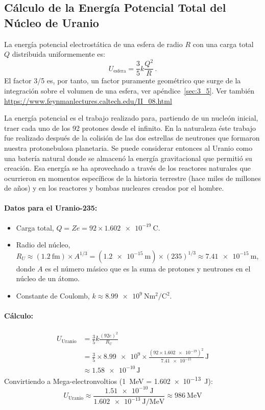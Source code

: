 \documentclass[11pt,a4paper]{book}
\begin{document}
\subsection*{Cálculo de la Energía Potencial Total del Núcleo de Uranio}
La energía potencial electrostática de una esfera de radio $R$ con una carga total $Q$ distribuida uniformemente es:
\begin{equation}
    U_{\text{esfera}} = \frac{3}{5} k \frac{Q^2}{R}\,.
\end{equation}
El factor 3/5 es, por tanto, un factor puramente geométrico que surge de la integración sobre el volumen de una esfera, ver apéndice~\ref{sec:3_5}. Ver también \url{https://www.feynmanlectures.caltech.edu/II_08.html}

La energía potencial es el trabajo realizado para, partiendo de un nucleón inicial, traer cada uno de los 92 protones desde el infinito. En la naturaleza éste trabajo fue realizado después de la colisión de las dos estrellas de neutrones que formaron nuestra protonebulosa planetaria. Se puede considerar entonces al Uranio como una batería natural donde se almacenó la energía gravitacional que permitió su creación. Esa energía se ha aprovechado a través de los reactores naturales que ocurrieron en momentos específicos de la historia terrestre (hace miles de millones de años) y en los reactores y bombas nucleares creados por el hombre.


\paragraph{Datos para el Uranio-235:}
\begin{itemize}
    \item Carga total, $Q = Z e = 92 \times \SI{1.602e-19}{\coulomb}$.
    \item Radio del núcleo, $R_U \approx (\SI{1.2}{\femto\meter}) \times A^{1/3} = (\SI{1.2e-15}{\meter}) \times (235)^{1/3} \approx \SI{7.41e-15}{\meter}$, donde $A$ es el número másico que es la suma de protones y neutrones en el núcleo de un átomo.
    \item Constante de Coulomb, $k \approx \SI{8.99e9}{\newton\meter\squared\per\coulomb\squared}$.
\end{itemize}

\paragraph{Cálculo:}
\begin{align*}
    U_{\text{Uranio}} &= \frac{3}{5} k \frac{(92e)^2}{R_U} \\
    &= \frac{3}{5} \times \num{8.99e9} \times \frac{(92 \times \num{1.602e-19})^2}{\num{7.41e-15}} \, \si{\joule} \\
    &\approx \num{1.58e-10} \, \si{\joule}
\end{align*}
Convirtiendo a Mega-electronvoltios (\SI{1}{\mega\electronvolt} = \SI{1.602e-13}{\joule}):
\[ U_{\text{Uranio}} \approx \frac{\SI{1.51e-10}{\joule}}{\SI{1.602e-13}{\joule\per\mega\electronvolt}} \approx \SI{986}{\mega\electronvolt} \]
\end{document}
